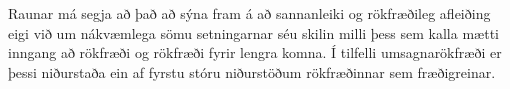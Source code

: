Raunar má segja að það að sýna fram á að sannanleiki og rökfræðileg afleiðing eigi við um nákvæmlega sömu setningarnar séu skilin milli þess sem kalla mætti inngang að rökfræði og rökfræði fyrir lengra komna. Í tilfelli umsagnarökfræði er þessi niðurstaða ein af fyrstu stóru niðurstöðum rökfræðinnar sem fræðigreinar.



